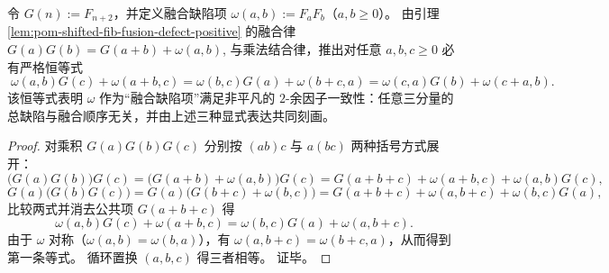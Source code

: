 \begin{proposition}\label{prop:pom-fusion-defect-2cocycle-identity}
令 \(G(n):=F_{n+2}\)，并定义融合缺陷项
\(
\omega(a,b):=F_aF_b
\)（\(a,b\ge 0\)）。
由引理 \ref{lem:pom-shifted-fib-fusion-defect-positive} 的融合律
\(
G(a)G(b)=G(a+b)+\omega(a,b)
\),
与乘法结合律，推出对任意 \(a,b,c\ge 0\) 必有严格恒等式
\[
\boxed{\;
\omega(a,b)G(c)+\omega(a+b,c)
=\omega(b,c)G(a)+\omega(b+c,a)
=\omega(c,a)G(b)+\omega(c+a,b).\;}
\]
该恒等式表明 \(\omega\) 作为“融合缺陷项”满足非平凡的 \(2\)-余因子一致性：任意三分量的总缺陷与融合顺序无关，并由上述三种显式表达共同刻画。
\end{proposition}
\begin{proof}
对乘积 \(G(a)G(b)G(c)\) 分别按 \((ab)c\) 与 \(a(bc)\) 两种括号方式展开：
\[
\bigl(G(a)G(b)\bigr)G(c)=\bigl(G(a+b)+\omega(a,b)\bigr)G(c)=G(a+b+c)+\omega(a+b,c)+\omega(a,b)G(c),
\]
\[
G(a)\bigl(G(b)G(c)\bigr)=G(a)\bigl(G(b+c)+\omega(b,c)\bigr)=G(a+b+c)+\omega(a,b+c)+\omega(b,c)G(a),
\]
比较两式并消去公共项 \(G(a+b+c)\) 得
\[
\omega(a,b)G(c)+\omega(a+b,c)
=\omega(b,c)G(a)+\omega(a,b+c).
\]
由于 \(\omega\) 对称（\(\omega(a,b)=\omega(b,a)\)），有 \(\omega(a,b+c)=\omega(b+c,a)\)，从而得到第一条等式。
循环置换 \((a,b,c)\) 得三者相等。
证毕。
\end{proof}

\endinput
